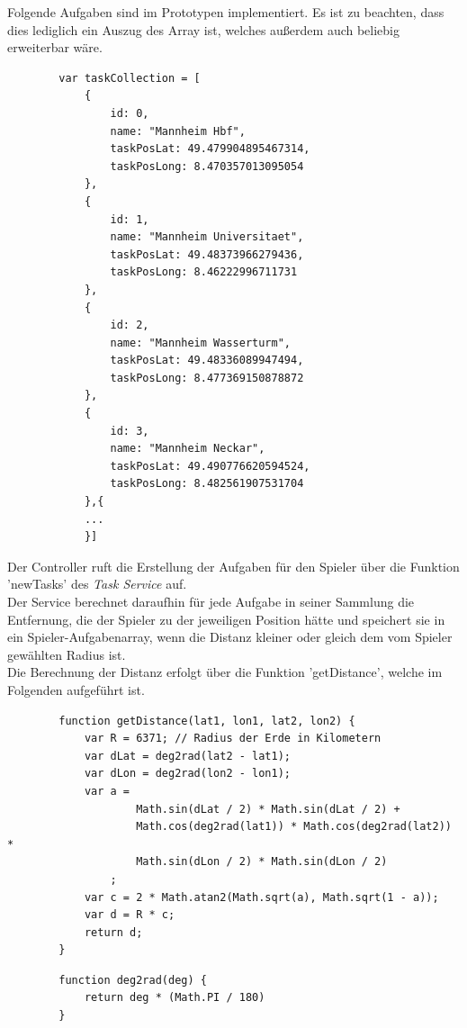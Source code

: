 Folgende Aufgaben sind im Prototypen implementiert. Es ist zu beachten, dass dies lediglich ein Auszug des Array ist, welches außerdem auch beliebig erweiterbar wäre.
\begin{lstlisting}
        var taskCollection = [
            {
                id: 0,
                name: "Mannheim Hbf",
                taskPosLat: 49.479904895467314,
                taskPosLong: 8.470357013095054
            },
            {
                id: 1,
                name: "Mannheim Universitaet",
                taskPosLat: 49.48373966279436,
                taskPosLong: 8.46222996711731
            },
            {
                id: 2,
                name: "Mannheim Wasserturm",
                taskPosLat: 49.48336089947494,
                taskPosLong: 8.477369150878872
            },
            {
                id: 3,
                name: "Mannheim Neckar",
                taskPosLat: 49.490776620594524,
                taskPosLong: 8.482561907531704
            },{
            ...
            }]
\end{lstlisting}

Der Controller ruft die Erstellung der Aufgaben für den Spieler über die Funktion 'newTasks' des \emph{Task Service} auf.
\\
Der Service berechnet daraufhin für jede Aufgabe in seiner Sammlung die Entfernung, die der Spieler zu der jeweiligen Position hätte und speichert sie in ein Spieler-Aufgabenarray, wenn die Distanz kleiner oder gleich dem vom Spieler gewählten Radius ist.
\\
Die Berechnung der Distanz erfolgt über die Funktion 'getDistance', welche im Folgenden aufgeführt ist.
\begin{lstlisting}
        function getDistance(lat1, lon1, lat2, lon2) {
            var R = 6371; // Radius der Erde in Kilometern
            var dLat = deg2rad(lat2 - lat1);
            var dLon = deg2rad(lon2 - lon1);
            var a =
                    Math.sin(dLat / 2) * Math.sin(dLat / 2) +
                    Math.cos(deg2rad(lat1)) * Math.cos(deg2rad(lat2)) *
                    Math.sin(dLon / 2) * Math.sin(dLon / 2)
                ;
            var c = 2 * Math.atan2(Math.sqrt(a), Math.sqrt(1 - a));
            var d = R * c;
            return d;
        }
\end{lstlisting}
\cite{Movable-Type}

\begin{lstlisting}
        function deg2rad(deg) {
            return deg * (Math.PI / 180)
        }
\end{lstlisting}
\cite{deg2rad}

